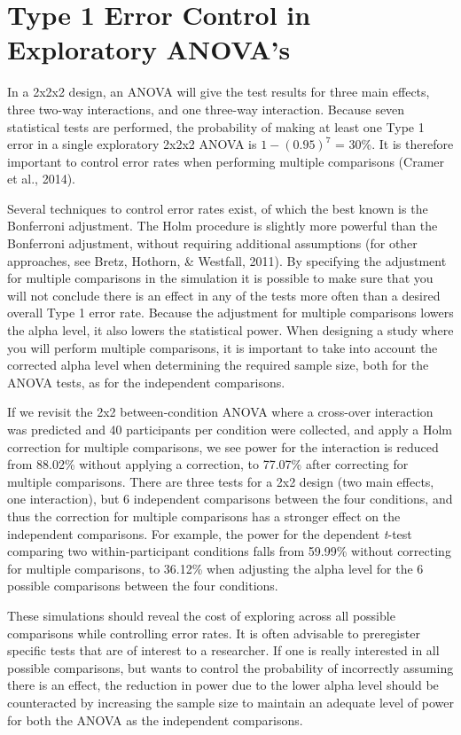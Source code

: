 \documentclass[,jou, draftfirst, a4paper,floatsintext]{apa6}
\begin{document}
\hypertarget{type-1-error-control-in-exploratory-anovas}{%
\section{Type 1 Error Control in Exploratory ANOVA's}\label{type-1-error-control-in-exploratory-anovas}}

In a 2x2x2 design, an ANOVA will give the test results for three main effects, three two-way interactions, and one three-way interaction.
Because seven statistical tests are performed, the probability of making at least one Type 1 error in a single exploratory 2x2x2 ANOVA is \(1-(0.95)^7\) = 30\%.
It is therefore important to control error rates when performing multiple comparisons (Cramer et al., 2014).

Several techniques to control error rates exist, of which the best known is the Bonferroni adjustment.
The Holm procedure is slightly more powerful than the Bonferroni adjustment, without requiring additional assumptions (for other approaches, see Bretz, Hothorn, \& Westfall, 2011).
By specifying the adjustment for multiple comparisons in the simulation it is possible to make sure that you will not conclude there is an effect in any of the tests more often than a desired overall Type 1 error rate.
Because the adjustment for multiple comparisons lowers the alpha level, it also lowers the statistical power.
When designing a study where you will perform multiple comparisons, it is important to take into account the corrected alpha level when determining the required sample size, both for the ANOVA tests, as for the independent comparisons.

If we revisit the 2x2 between-condition ANOVA where a cross-over interaction was predicted and 40 participants per condition were collected, and apply a Holm correction for multiple comparisons, we see power for the interaction is reduced from 88.02\% without applying a correction, to 77.07\% after correcting for multiple comparisons.
There are three tests for a 2x2 design (two main effects, one interaction), but 6 independent comparisons between the four conditions, and thus the correction for multiple comparisons has a stronger effect on the independent comparisons.
For example, the power for the dependent \emph{t}-test comparing two within-participant conditions falls from 59.99\% without correcting for multiple comparisons, to 36.12\% when adjusting the alpha level for the 6 possible comparisons between the four conditions.

These simulations should reveal the cost of exploring across all possible comparisons while controlling error rates.
It is often advisable to preregister specific tests that are of interest to a researcher.
If one is really interested in all possible comparisons, but wants to control the probability of incorrectly assuming there is an effect, the reduction in power due to the lower alpha level should be counteracted by increasing the sample size to maintain an adequate level of power for both the ANOVA as the independent comparisons.
\end{document}

